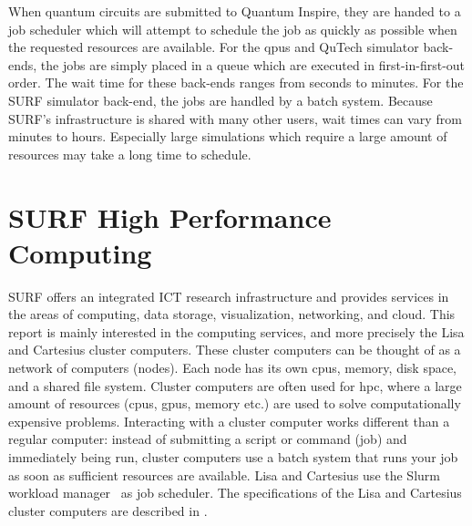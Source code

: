 When quantum circuits are submitted to Quantum Inspire, they are handed to a job scheduler which will attempt to schedule the job as quickly as possible when the requested resources are available.
For the \glspl{qpu} and QuTech simulator back-ends, the jobs are simply placed in a queue which are executed in first-in-first-out order.
The wait time for these back-ends ranges from seconds to minutes.
For the SURF simulator back-end, the jobs are handled by a batch system.
Because SURF's infrastructure is shared with many other users, wait times can vary from minutes to hours.
Especially large simulations which require a large amount of resources may take a long time to schedule.

\section{SURF High Performance Computing}
SURF offers an integrated ICT research infrastructure and provides services in the areas of computing, data storage, visualization, networking, and cloud.
This report is mainly interested in the computing services, and more precisely the Lisa and Cartesius cluster computers.
These cluster computers can be thought of as a network of computers (nodes).
Each node has its own \glspl{cpu}, memory, disk space, and a shared file system.
Cluster computers are often used for \acrfull{hpc}, where a large amount of resources (\glspl{cpu}, \glspl{gpu}, memory etc.) are used to solve computationally expensive problems.
Interacting with a cluster computer works different than a regular computer: instead of submitting a script or command (job) and immediately being run, cluster computers use a batch system that runs your job as soon as sufficient resources are available.
Lisa and Cartesius use the Slurm workload manager~\cite{yoo2003slurm} as job scheduler.
The specifications of the Lisa and Cartesius cluster computers are described in .
